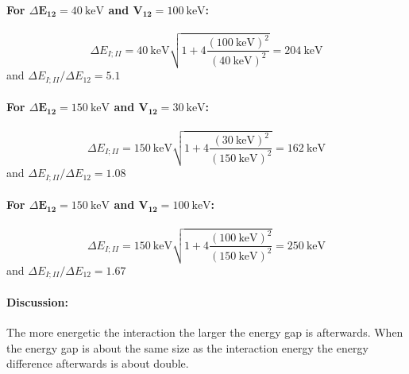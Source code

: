 \paragraph{For $\Delta \bm{E_{12}} = \SI{40}{\kilo\electronvolt}$ and $\bm{V_{12}} = \SI{100}{\kilo\electronvolt}$:}
\begin{equation}
	\Delta E_{I;II} = \SI{40}{\kilo\electronvolt} \sqrt{1 + 4\frac{(\SI{100}{\kilo\electronvolt})^2}{(\SI{40}{\kilo\electronvolt})^2}} = \SI{204}{\kilo\electronvolt}
\end{equation}
and $\Delta E_{I;II} / \Delta E_{12} = 5.1$

\paragraph{For $\Delta \bm{E_{12}} = \SI{150}{\kilo\electronvolt}$ and $\bm{V_{12}} = \SI{30}{\kilo\electronvolt}$:}
\begin{equation}
	\Delta E_{I;II} = \SI{150}{\kilo\electronvolt} \sqrt{1 + 4\frac{(\SI{30}{\kilo\electronvolt})^2}{(\SI{150}{\kilo\electronvolt})^2}} = \SI{162}{\kilo\electronvolt}
\end{equation}
and $\Delta E_{I;II} / \Delta E_{12} = 1.08$

\paragraph{For $\Delta \bm{E_{12}} = \SI{150}{\kilo\electronvolt}$ and $\bm{V_{12}} = \SI{100}{\kilo\electronvolt}$:}
\begin{equation}
	\Delta E_{I;II} = \SI{150}{\kilo\electronvolt} \sqrt{1 + 4\frac{(\SI{100}{\kilo\electronvolt})^2}{(\SI{150}{\kilo\electronvolt})^2}} = \SI{250}{\kilo\electronvolt}
\end{equation}
and $\Delta E_{I;II} / \Delta E_{12} = 1.67$

\paragraph{Discussion:} The more energetic the interaction the larger the energy gap is afterwards. When the energy gap is about the same size as the interaction energy the energy difference afterwards is about double.